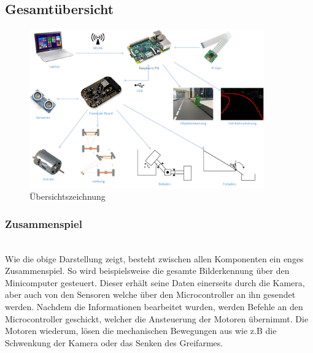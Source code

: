 \subsection{Gesamtübersicht}

\begin{figure}[h!]%
\centering
\includegraphics[width=0.9\textwidth]{03_Loesungskonzept/pictures/uebersichtszeichnung.png}
\caption{Übersichtszeichnung}
\label{fig:Java}
\end{figure}

\subsubsection{Zusammenspiel}\\[0.2cm]
Wie die obige Darstellung zeigt, besteht zwischen allen Komponenten ein enges Zusammenspiel.
So wird beispielsweise die gesamte Bilderkennung über den Minicomputer gesteuert. Dieser erhält seine Daten einerseits durch die Kamera, aber auch von den Sensoren welche über den Microcontroller an ihn gesendet werden. Nachdem die Informationen bearbeitet wurden, werden Befehle an den Microcontroller geschickt, welcher die Ansteuerung der Motoren übernimmt. Die Motoren wiederum, lösen die mechanischen Bewegungen aus wie z.B die Schwenkung der Kamera oder das Senken des Greifarmes.\\[0.2cm]
